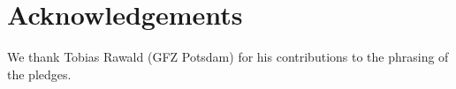 \documentclass[a4paper,UKenglish]{dagman}
\begin{document}
\section*{Acknowledgements}

We thank Tobias Rawald (GFZ Potsdam) for his contributions to the phrasing of the pledges.


% 







\end{document}
